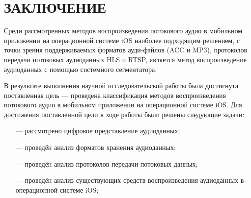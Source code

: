 \setupsectionstar
\section*{ЗАКЛЮЧЕНИЕ}
    \par Среди рассмотренных методов воспроизведения потокового аудио в мобильном приложении на операционной системе iOS наиболее подходящим решением, 
    с точки зрения поддерживаемых форматов ауди-файлов (ACC и MP3), протоколов передачи потоковых аудиоданных HLS и RTSP, является метод воспроизведение аудиоданных с помощью системного сегментатора.
    
    В результате выполнения научной исследовательской работы была достигнута поставленная цель --- проведена классификация методов воспроизведения потокового аудио в мобильном приложении на операционной системе iOS.
    Для достижения поставленной цели в ходе работы были решены следующие задачи:
    \begin{itemize}
        \item[---] рассмотрено цифровое представление аудиоданных;
        \item[---] проведён анализ форматов хранения аудиоданных;
        \item[---] проведён анализ протоколов передачи потоковых данных;
        \item[---] проведён анализ существующих средств воспроизведения аудиоданных в операционной системе iOS;
    \end{itemize} 



\pagebreak